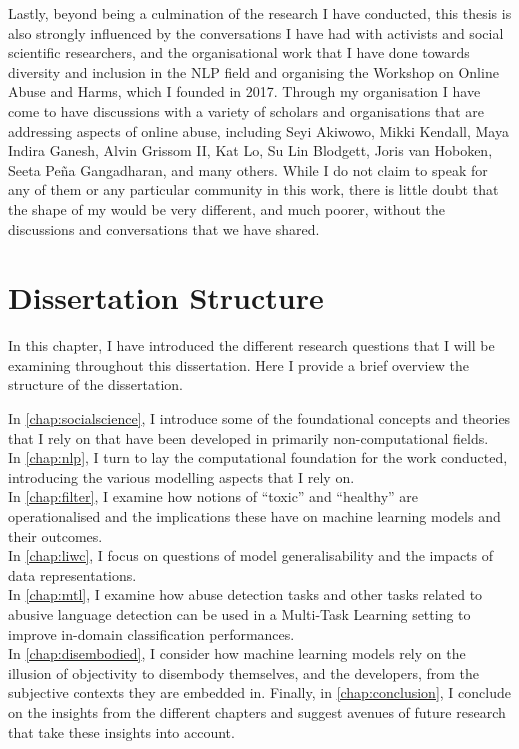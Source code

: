 {{Lastly, beyond being a culmination of the research I have conducted, this thesis is also strongly influenced by the conversations I have had with activists and social scientific researchers, and the organisational work that I have done towards diversity and inclusion in the NLP field and organising the Workshop on Online Abuse and Harms, which I founded in 2017.
Through my organisation I have come to have discussions with a variety of scholars and organisations that are addressing aspects of online abuse, including Seyi Akiwowo, Mikki Kendall, Maya Indira Ganesh, Alvin Grissom II, Kat Lo, Su Lin Blodgett, Joris van Hoboken, Seeta Pe{\~n}a Gangadharan, and many others.
While I do not claim to speak for any of them or any particular community in this work, there is little doubt that the shape of my would be very different, and much poorer, without the discussions and conversations that we have shared.
}
\section{Dissertation Structure}\label{sec:structure}

In this chapter, I have introduced the different research questions that I will be examining throughout this dissertation. Here I provide a brief overview the structure of the dissertation.

In \cref{chap:socialscience}, I introduce some of the foundational concepts and theories that I rely on that have been developed in primarily non-computational fields.\\
In \cref{chap:nlp}, I turn to lay the computational foundation for the work conducted, introducing the various modelling aspects that I rely on.\\
In \cref{chap:filter}, I examine how notions of ``toxic'' and ``healthy'' are operationalised and the implications these have on machine learning models and their outcomes.\\
In \cref{chap:liwc}, I focus on questions of model generalisability and the impacts of data representations.\\
In \cref{chap:mtl}, I examine how abuse detection tasks and other tasks related to abusive language detection can be used in a Multi-Task Learning setting to improve in-domain classification performances.\\
In \cref{chap:disembodied}, I consider how machine learning models rely on the illusion of objectivity to disembody themselves, and the developers, from the subjective contexts they are embedded in.
Finally, in \cref{chap:conclusion}, I conclude on the insights from the different chapters and suggest avenues of future research that take these insights into account.


}
